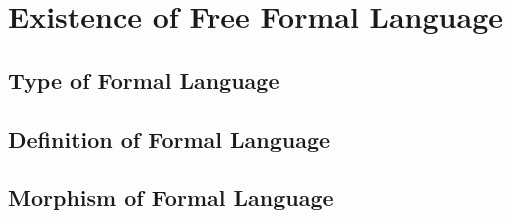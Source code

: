 \section{Existence of Free Formal Language}
    \subsection{Type of Formal Language}
        
    \subsection{Definition of Formal Language}
        
    \subsection{Morphism of Formal Language}
        

